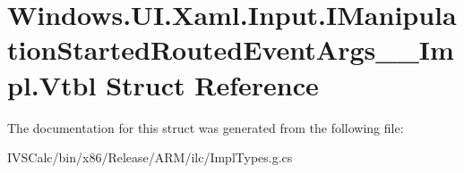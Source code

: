 \hypertarget{struct_windows_1_1_u_i_1_1_xaml_1_1_input_1_1_i_manipulation_started_routed_event_args_____impl_1_1_vtbl}{}\section{Windows.\+U\+I.\+Xaml.\+Input.\+I\+Manipulation\+Started\+Routed\+Event\+Args\+\_\+\+\_\+\+Impl.\+Vtbl Struct Reference}
\label{struct_windows_1_1_u_i_1_1_xaml_1_1_input_1_1_i_manipulation_started_routed_event_args_____impl_1_1_vtbl}


The documentation for this struct was generated from the following file\+:\begin{DoxyCompactItemize}
\item 
I\+V\+S\+Calc/bin/x86/\+Release/\+A\+R\+M/ilc/Impl\+Types.\+g.\+cs\end{DoxyCompactItemize}
